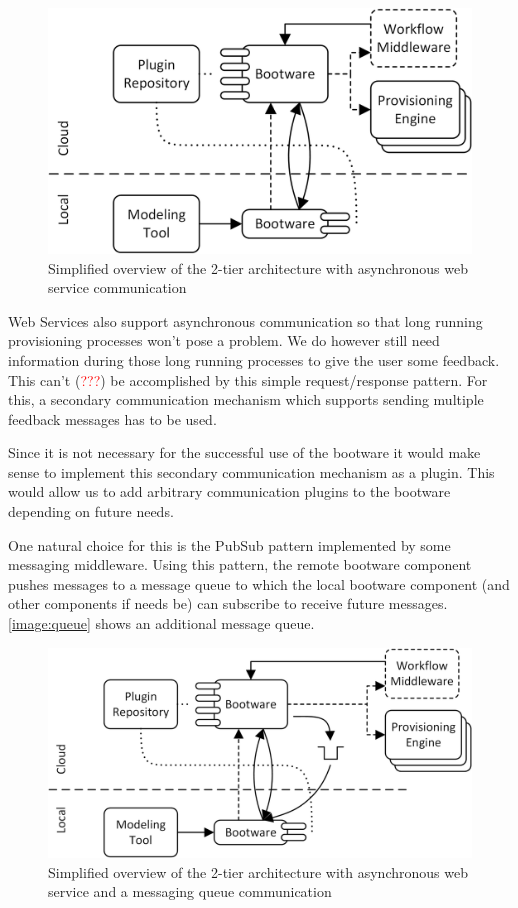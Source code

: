 \begin{figure}[!htbp]
	\centering
	\includegraphics[resolution=600]{design/assets/simple_webservice}
	\caption{Simplified overview of the 2-tier architecture with asynchronous web service communication}
	\label{image:webservice}
\end{figure}

Web Services also support asynchronous communication so that long running provisioning processes won't pose a problem.
We do however still need information during those long running processes to give the user some feedback.
This can't (\textcolor{red}{???}) be accomplished by this simple request/response pattern.
For this, a secondary communication mechanism which supports sending multiple feedback messages has to be used.

Since it is not necessary for the successful use of the bootware it would make sense to implement this secondary communication mechanism as a plugin.
This would allow us to add arbitrary communication plugins to the bootware depending on future needs.

One natural choice for this is the PubSub pattern implemented by some messaging middleware.
Using this pattern, the remote bootware component pushes messages to a message queue to which the local bootware component (and other components if needs be) can subscribe to receive future messages.
\autoref{image:queue} shows an additional message queue.

\begin{figure}[!htbp]
	\centering
	\includegraphics[resolution=600]{design/assets/simple_queue}
	\caption{Simplified overview of the 2-tier architecture with asynchronous web service and a messaging queue communication}
	\label{image:queue}
\end{figure}
